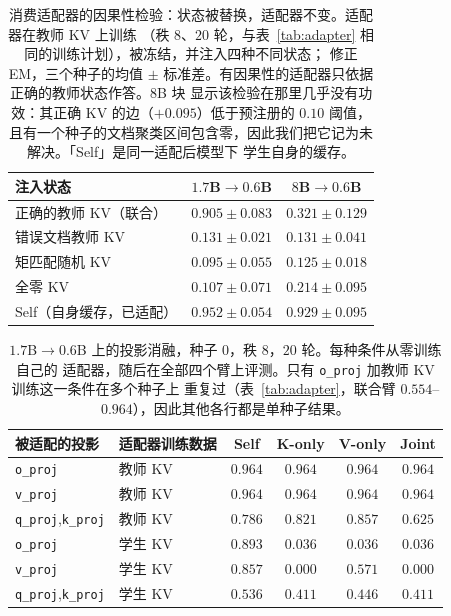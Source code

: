 \documentclass[11pt]{article}
\begin{document}
\begin{table}[t]
\centering
\small
\caption{消费适配器的因果性检验：状态被替换，适配器不变。适配器在教师 KV 上训练
（秩 8、$20$ 轮，与表~\ref{tab:adapter} 相同的训练计划），被冻结，并注入四种不同状态；
修正 EM，三个种子的均值 $\pm$ 标准差。有因果性的适配器只依据正确的教师状态作答。$8$B 块
显示该检验在那里几乎没有功效：其正确 KV 的边（$+0.095$）低于预注册的 $0.10$ 阈值，
且有一个种子的文档聚类区间包含零，因此我们把它记为未解决。「Self」是同一适配后模型下
学生自身的缓存。}
\label{tab:causal}
\begin{tabular}{lcc}
\toprule
注入状态 & $1.7$B$\to0.6$B & $8$B$\to0.6$B \\
\midrule
正确的教师 KV（联合）        & $\mathbf{0.905{\pm}0.083}$ & $\mathbf{0.321{\pm}0.129}$ \\
错误文档教师 KV          & $0.131{\pm}0.021$ & $0.131{\pm}0.041$ \\
矩匹配随机 KV           & $0.095{\pm}0.055$ & $0.125{\pm}0.018$ \\
全零 KV                            & $0.107{\pm}0.071$ & $0.214{\pm}0.095$ \\
\midrule
Self（自身缓存，已适配）          & $0.952{\pm}0.054$ & $0.929{\pm}0.095$ \\
\bottomrule
\end{tabular}
\end{table}

\begin{table}[t]
\centering
\small
\caption{$1.7$B$\to0.6$B 上的投影消融，种子 0，秩 8，$20$ 轮。每种条件从零训练自己的
适配器，随后在全部四个臂上评测。只有 \texttt{o\_proj} 加教师 KV 训练这一条件在多个种子上
重复过（表~\ref{tab:adapter}，联合臂 $0.554$--$0.964$），因此其他各行都是单种子结果。}
\label{tab:ablation}
\begin{tabular}{llcccc}
\toprule
被适配的投影 & 适配器训练数据 & Self & K-only & V-only & Joint \\
\midrule
\texttt{o\_proj} & 教师 KV & $0.964$ & $\mathbf{0.964}$ & $\mathbf{0.964}$ & $\mathbf{0.964}$ \\
\texttt{v\_proj} & 教师 KV & $0.964$ & $0.964$ & $0.964$ & $0.964$ \\
\texttt{q\_proj},\texttt{k\_proj} & 教师 KV & $0.786$ & $0.821$ & $0.857$ & $0.625$ \\
\midrule
\texttt{o\_proj} & 学生 KV & $0.893$ & $0.036$ & $0.036$ & $0.036$ \\
\texttt{v\_proj} & 学生 KV & $0.857$ & $0.000$ & $0.571$ & $0.000$ \\
\texttt{q\_proj},\texttt{k\_proj} & 学生 KV & $0.536$ & $0.411$ & $0.446$ & $0.411$ \\
\bottomrule
\end{tabular}
\end{table}
\end{document}
